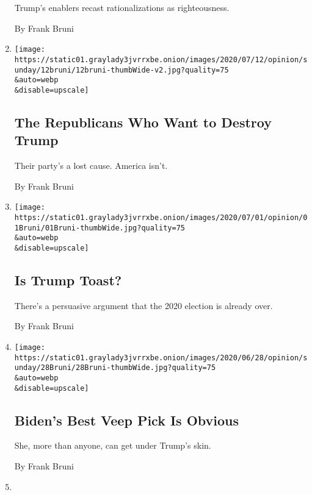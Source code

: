 \begin{enumerate}
  Trump's enablers recast rationalizations as righteousness.

  By Frank Bruni
\item
  \href{/2020/07/11/opinion/sunday/republican-party-trump-2020.html}{}

  \texttt{[image: https://static01.graylady3jvrrxbe.onion/images/2020/07/12/opinion/sunday/12bruni/12bruni-thumbWide-v2.jpg?quality=75\\\&auto=webp\\\&disable=upscale]}

  \hypertarget{the-republicans-who-want-to-destroy-trump}{%
  \subsection{The Republicans Who Want to Destroy
  Trump}\label{the-republicans-who-want-to-destroy-trump}}

  Their party's a lost cause. America isn't.

  By Frank Bruni
\item
  \href{/2020/07/01/opinion/trump-lose-2020-election.html}{}

  \texttt{[image: https://static01.graylady3jvrrxbe.onion/images/2020/07/01/opinion/01Bruni/01Bruni-thumbWide.jpg?quality=75\\\&auto=webp\\\&disable=upscale]}

  \hypertarget{is-trump-toast}{%
  \subsection{Is Trump Toast?}\label{is-trump-toast}}

  There's a persuasive argument that the 2020 election is already over.

  By Frank Bruni
\item
  \href{/2020/06/27/opinion/sunday/tammy-duckworth-biden-2020.html}{}

  \texttt{[image: https://static01.graylady3jvrrxbe.onion/images/2020/06/28/opinion/sunday/28Bruni/28Bruni-thumbWide.jpg?quality=75\\\&auto=webp\\\&disable=upscale]}

  \hypertarget{bidens-best-veep-pick-is-obvious}{%
  \subsection{Biden's Best Veep Pick Is
  Obvious}\label{bidens-best-veep-pick-is-obvious}}

  She, more than anyone, can get under Trump's skin.

  By Frank Bruni
\item
  \href{/2020/06/20/opinion/sunday/trump-supreme-court.html}{}


\end{enumerate}
